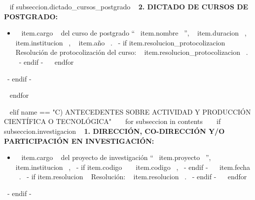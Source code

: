     ~{ if subseccion.dictado_cursos_postgrado }~
      \textbf{2. DICTADO DE CURSOS DE POSTGRADO:}
      \begin{itemize}
      ~{ for item in subseccion.dictado_cursos_postgrado }~
        \item ~{{ item.cargo }}~ del curso de postgrado ``~{{ item.nombre }}~'', ~{{ item.duracion }}~, ~{{ item.institucion }}~, ~{{ item.año }}~.
              ~{- if item.resolucion_protocolizacion }~ Resolución de protocolización del curso: ~{{ item.resolucion_protocolizacion }}~. ~{- endif -}~
        \espacioEntreItems{}
      ~{ endfor }~
      \end{itemize}
      \espacioEntreSubSecciones{}
    ~{- endif -}~

  ~{ endfor }~
  \espacioEntreSecciones{}


~{ elif name == "C) ANTECEDENTES SOBRE ACTIVIDAD Y PRODUCCIÓN CIENTÍFICA O TECNOLÓGICA" }~
  ~{ for subseccion in contents }~
    ~{ if subseccion.investigacion }~
      \textbf{1. DIRECCIÓN, CO-DIRECCIÓN Y/O PARTICIPACIÓN EN INVESTIGACIÓN:}
      \begin{itemize}
      ~{ for item in subseccion.investigacion }~
        \item ~{{ item.cargo }}~ del proyecto de investigación ``~{{ item.proyecto }}~'', ~{{ item.institucion }}~,
              ~{- if item.codigo }~ ~{{ item.codigo }}~, ~{- endif -}~
              ~{{ item.fecha }}~.
              ~{- if item.resolucion }~ Resolución: ~{{ item.resolucion }}~. ~{- endif -}~
        \espacioEntreItems{}
      ~{ endfor }~
      \end{itemize}
      \espacioEntreSubSecciones{}
    ~{- endif -}~

